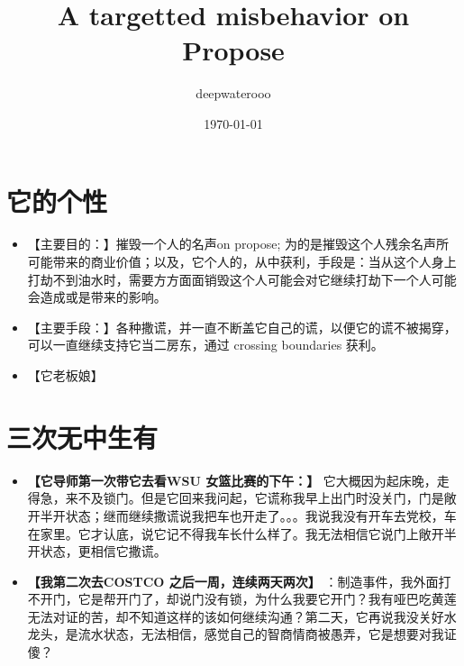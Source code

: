 \documentclass[9pt, b5paper]{article}
\author{deepwaterooo}
\date{\today}
\title{A targetted misbehavior on Propose}
\begin{document}
\maketitle
\tableofcontents


\section{它的个性}
\label{sec-1}
\begin{itemize}
\item 【主要目的：】摧毁一个人的名声on propose; 为的是摧毁这个人残余名声所可能带来的商业价值；以及，它个人的，从中获利，手段是：当从这个人身上打劫不到油水时，需要方方面面销毁这个人可能会对它继续打劫下一个人可能会造成或是带来的影响。
\item 【主要手段：】各种撒谎，并一直不断盖它自己的谎，以便它的谎不被揭穿，可以一直继续支持它当二房东，通过 crossing boundaries 获利。
\item 【它老板娘】
\end{itemize}
\section{三次无中生有}
\label{sec-2}
\begin{itemize}
\item \textbf{【它导师第一次带它去看WSU 女篮比赛的下午：】} 它大概因为起床晚，走得急，来不及锁门。但是它回来我问起，它谎称我早上出门时没关门，门是敞开半开状态；继而继续撒谎说我把车也开走了。。。我说我没有开车去党校，车在家里。它才认底，说它记不得我车长什么样了。我无法相信它说门上敞开半开状态，更相信它撒谎。
\item \textbf{【我第二次去COSTCO 之后一周，连续两天两次】} ：制造事件，我外面打不开门，它是帮开门了，却说门没有锁，为什么我要它开门？我有哑巴吃黄莲无法对证的苦，却不知道这样的该如何继续沟通？第二天，它再说我没关好水龙头，是流水状态，无法相信，感觉自己的智商情商被愚弄，它是想要对我证傻？
\end{itemize}
\end{document}

